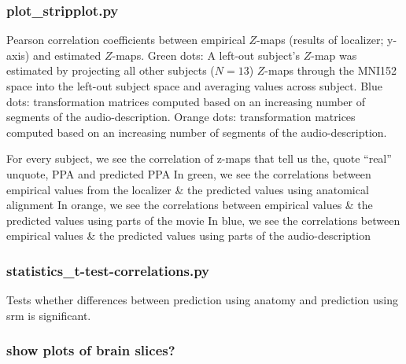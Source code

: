 \subsubsection{plot\_stripplot.py}

%
Pearson correlation coefficients between empirical $Z$-maps (results of
localizer; y-axis) and estimated $Z$-maps.
%
Green dots: A left-out subject's $Z$-map was estimated by projecting all other
subjects ($N = 13$) $Z$-maps through the MNI152 space into the left-out subject space and averaging values across subject.
%
Blue dots: transformation matrices computed based on an increasing number of
segments of the audio-description.
%
Orange dots: transformation matrices computed based on an increasing number of
segments of the audio-description.


For every subject, we see the correlation of z-maps that tell us the, quote
``real'' unquote, PPA and predicted PPA
%
In green, we see the correlations between empirical values from the localizer \&
the predicted values using anatomical alignment
%
In orange, we see the correlations between empirical values \& the predicted
values using parts of the movie
%
In blue, we see the correlations between empirical values \& the predicted
values using parts of the audio-description


\subsubsection{statistics\_t-test-correlations.py}

Tests whether differences between prediction using anatomy and prediction using
\ac{srm} is significant.


\subsubsection{show plots of brain slices?}






